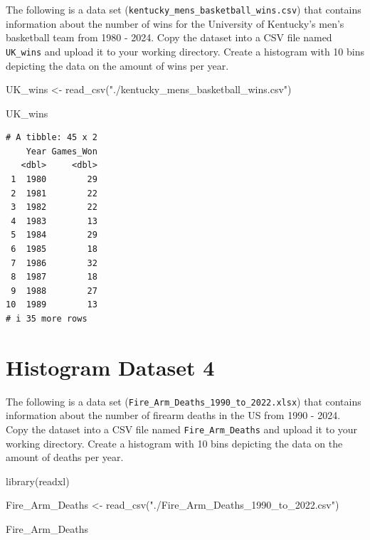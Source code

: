 \documentclass[
  letterpaper,
  DIV=11,
  numbers=noendperiod]{scrreprt}
\newenvironment{Shaded}{\begin{snugshade}}{\end{snugshade}}
\newcommand{\FunctionTok}[1]{\textcolor[rgb]{0.28,0.35,0.67}{#1}}
\newcommand{\NormalTok}[1]{\textcolor[rgb]{0.00,0.23,0.31}{#1}}
\newcommand{\OtherTok}[1]{\textcolor[rgb]{0.00,0.23,0.31}{#1}}
\newcommand{\StringTok}[1]{\textcolor[rgb]{0.13,0.47,0.30}{#1}}
\begin{document}

The following is a data set
(\texttt{kentucky\_mens\_basketball\_wins.csv}) that contains
information about the number of wins for the University of Kentucky's
men's basketball team from 1980 - 2024. Copy the dataset into a CSV file
named \texttt{UK\_wins} and upload it to your working directory. Create
a histogram with 10 bins depicting the data on the amount of wins per
year.

\begin{Shaded}
\begin{Highlighting}[]
\NormalTok{UK\_wins }\OtherTok{\textless{}{-}} \FunctionTok{read\_csv}\NormalTok{(}\StringTok{"./kentucky\_mens\_basketball\_wins.csv"}\NormalTok{)}

\NormalTok{UK\_wins}
\end{Highlighting}
\end{Shaded}

\begin{verbatim}
# A tibble: 45 x 2
    Year Games_Won
   <dbl>     <dbl>
 1  1980        29
 2  1981        22
 3  1982        22
 4  1983        13
 5  1984        29
 6  1985        18
 7  1986        32
 8  1987        18
 9  1988        27
10  1989        13
# i 35 more rows
\end{verbatim}

\section*{Histogram Dataset 4}\label{histogram-dataset-4}


The following is a data set
(\texttt{Fire\_Arm\_Deaths\_1990\_to\_2022.xlsx}) that contains
information about the number of firearm deaths in the US from 1990 -
2024. Copy the dataset into a CSV file named \texttt{Fire\_Arm\_Deaths}
and upload it to your working directory. Create a histogram with 10 bins
depicting the data on the amount of deaths per year.

\begin{Shaded}
\begin{Highlighting}[]
\FunctionTok{library}\NormalTok{(readxl)}

\NormalTok{Fire\_Arm\_Deaths }\OtherTok{\textless{}{-}} \FunctionTok{read\_csv}\NormalTok{(}\StringTok{"./Fire\_Arm\_Deaths\_1990\_to\_2022.csv"}\NormalTok{)}

\NormalTok{Fire\_Arm\_Deaths}
\end{Highlighting}
\end{Shaded}
\end{document}
